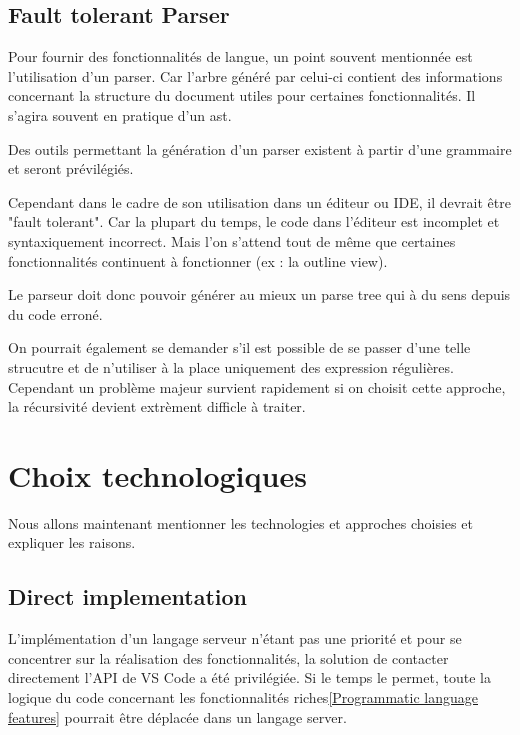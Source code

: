 \documentclass[
    iict, %
    il, %
]{heig-tb}
\begin{document}
\subsection{Fault tolerant Parser}
Pour fournir des fonctionnalités de langue, un point souvent mentionnée est l'utilisation d'un parser.
Car l'arbre généré par celui-ci contient des informations concernant la structure du document utiles pour certaines fonctionnalités.
Il s'agira souvent en pratique d'un \Gls{ast}.

Des outils permettant la génération d'un parser existent à partir d'une grammaire et seront prévilégiés.

Cependant dans le cadre de son utilisation dans un éditeur ou IDE, il devrait être "fault tolerant".
Car la plupart du temps, le code dans l'éditeur est incomplet et syntaxiquement incorrect.
Mais l'on s'attend tout de même que certaines fonctionnalités continuent à fonctionner (ex : la outline view).

Le parseur doit donc pouvoir générer au mieux un parse tree qui à du sens depuis du code erroné.

On pourrait également se demander s'il est possible de se passer d'une telle strucutre et de n'utiliser à la place uniquement des expression régulières.
Cependant un problème majeur survient rapidement si on choisit cette approche, la récursivité devient extrèment difficle à traiter. \cite{antlr-mega-tutorial}


\section{Choix technologiques}
Nous allons maintenant mentionner les technologies et approches choisies et expliquer les raisons.

\subsection{Direct implementation}
L'implémentation d'un langage serveur n'étant pas une priorité et pour se concentrer sur la réalisation des fonctionnalités, la solution de contacter directement l'API de VS Code a été privilégiée.
Si le temps le permet, toute la logique du code concernant les fonctionnalités riches\ref{Programmatic language features} pourrait être déplacée dans un langage server.
\end{document}
